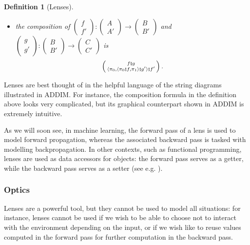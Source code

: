 \documentclass[12pt,a4paper,openright,twoside]{report}
\theoremstyle{plain}
\newtheorem{definition}[proposition]{Definition}
\theoremstyle{definition}
\begin{document}
\begin{definition}[Lenses]
\begin{itemize}
    \item the composition of $\left(\begin{smallmatrix} f \\ f' \end{smallmatrix}\right): \left(\begin{smallmatrix} A \\ A' \end{smallmatrix}\right) \to \left(\begin{smallmatrix} B \\ B' \end{smallmatrix}\right)$ and $\left(\begin{smallmatrix} g \\ g' \end{smallmatrix}\right): \left(\begin{smallmatrix} B \\ B' \end{smallmatrix}\right) \to \left(\begin{smallmatrix} C \\ C' \end{smallmatrix}\right)$ is
    \[\left(\begin{smallmatrix} f \fatsemi g \\ \langle \pi_0, \langle \pi_0 \fatsemi f, \pi_1 \rangle \fatsemi g' \rangle \fatsemi f' \end{smallmatrix}\right).\]
  \end{itemize}
\end{definition}


Lenses are best thought of in the helpful language of the string diagrams illustrated in ADDIM. For instance, the composition formula in the definition above looks very complicated, but its graphical counterpart shown in ADDIM is extremely intuitive.


As we will soon see, in machine learning, the forward pass of a lens is used to model forward propagation, whereas the associated backward pass is tasked with modelling backpropagation. In other contexts, such as functional programming, lenses are used as data accessors for objects: the forward pass serves as a getter, while the backward pass serves as a setter (see e.g. \cite{steckermeier2015lenses}).


\subsubsection{Optics}

Lenses are a powerful tool, but they cannot be used to model all situations: for instance, lenses cannot be used if we wish to be able to choose not to interact with the environment depending on the input, or if we wish like to reuse values computed in the forward pass for further computation in the backward pass.
\end{document}
